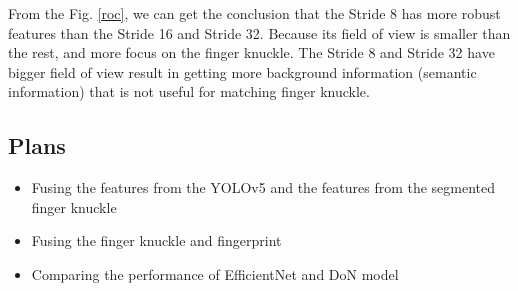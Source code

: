 From the Fig. \ref{roc}, we can get the conclusion that the Stride 8 has more robust features than the Stride 16 and Stride 32. Because its field of view is smaller than the rest, and more focus on the finger knuckle. The Stride 8 and Stride 32 have bigger field of view result in getting more background information (semantic information) that is not useful for matching finger knuckle.

\subsection{Plans}
\begin{itemize}
    \item Fusing the features from the YOLOv5 and the features from the segmented finger knuckle
    \item Fusing the finger knuckle and fingerprint
    \item Comparing the performance of EfficientNet and DoN model
\end{itemize}





